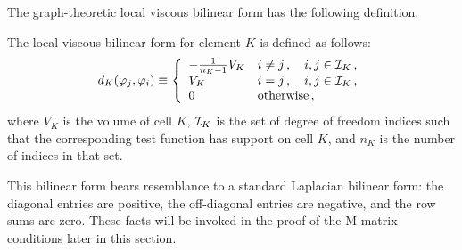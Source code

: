 The graph-theoretic local viscous bilinear form has the following definition.
\begin{defn}
   The local viscous bilinear form for element $K$ is defined as follows:
   \begin{equation}\label{eq:bilinearform}
     d_K(\varphi_j,\varphi_i) \equiv \left\{\begin{array}{l l}
       -\frac{1}{n_K - 1}V_K & i\ne j\,, \quad i,j\in \mathcal{I}_K\,, \\
       V_K                   & i = j \,, \quad i,j\in \mathcal{I}_K\,, \\
       0                     & \mbox{otherwise}\,,
     \end{array}\right.
   \end{equation}
   where $V_K$ is the volume of cell $K$, $\mathcal{I}_K$ is the set of degree
   of freedom indices such that the corresponding test function has support
   on cell $K$, and $n_K$ is the number of indices in that set.
\end{defn}
This bilinear form bears resemblance to a standard Laplacian bilinear form:
the diagonal entries are positive, the off-diagonal entries are negative, and
the row sums are zero. These facts will be invoked in the proof of the M-matrix
conditions later in this section.

